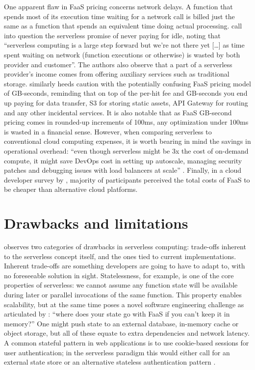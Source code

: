 One apparent flaw in FaaS pricing concerns network delays. A function that spends most of its execution time waiting for a network call is billed just the same as a function that spends an equivalent time doing actual processing. \textcite{fox17} call into question the serverless promise of never paying for idle, noting that ``serverless computing is a large step forward but we're not there yet [\ldots] as time spent waiting on network (function executions or otherwise) is wasted by both provider and customer''. The authors also observe that a part of a serverless provider's income comes from offering auxiliary services such as traditional storage. \textcite{eivy2017wary} similarly heeds caution with the potentially confusing FaaS pricing model of GB-seconds, reminding that on top of the per-hit fee and GB-seconds you end up paying for data transfer, S3 for storing static assets, API Gateway for routing and any other incidental services. It is also notable that as FaaS GB-second pricing comes in rounded-up increments of 100ms, any optimization under 100ms is wasted in a financial sense. However, when comparing serverless to conventional cloud computing expenses, it is worth bearing in mind the savings in operational overhead: ``even though serverless might be 3x the cost of on-demand compute, it might save DevOps cost in setting up autoscale, managing security patches and debugging issues with load balancers at scale'' \parencite{eivy2017wary}. Finally, in a cloud developer survey by \textcite{leitner18industrialpractice}, majority of participants perceived the total costs of FaaS to be cheaper than alternative cloud platforms.

\section{Drawbacks and limitations} \label{sec:limitations}

\textcite{robert2016serverlessarchitectures} observes two categories of drawbacks in serverless computing: trade-offs inherent to the serverless concept itself, and the ones tied to current implementations. Inherent trade-offs are something developers are going to have to adapt to, with no foreseeable solution in sight. Statelessness, for example, is one of the core properties of serverless: we cannot assume any function state will be available during later or parallel invocations of the same function. This property enables scalability, but at the same time poses a novel software engineering challenge as articulated by \textcite{robert2016serverlessarchitectures}: ``where does your state go with FaaS if you can’t keep it in memory?'' One might push state to an external database, in-memory cache or object storage, but all of these equate to extra dependencies and network latency. A common stateful pattern in web applications is to use cookie-based sessions for user authentication; in the serverless paradigm this would either call for an external state store or an alternative stateless authentication pattern \parencite{hendrickson16openlambda}.

